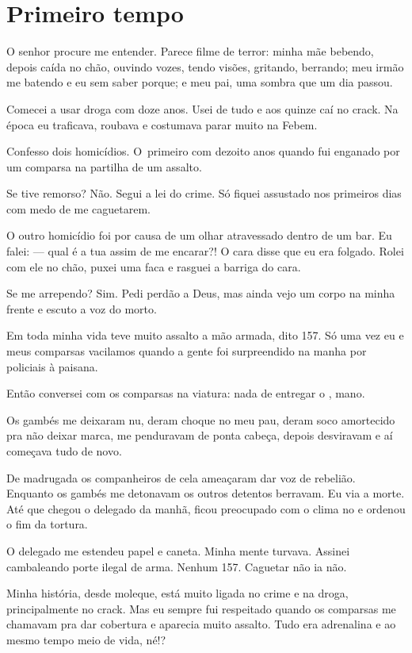  

\section{Primeiro tempo}

O senhor procure me entender. Parece filme de terror: minha mãe bebendo,
depois caída no chão, ouvindo vozes, tendo visões, gritando, berrando;
meu irmão me batendo e eu sem saber porque; e meu pai, uma sombra que um
dia passou.

\asterisc{}

Comecei a usar droga com doze anos. Usei de tudo e aos quinze caí no
crack. Na época eu traficava, roubava e costumava parar muito na Febem.

Confesso dois homicídios. O~primeiro com dezoito anos quando fui
enganado por um comparsa na partilha de um assalto.

Se tive remorso? Não. Segui a lei do crime. Só fiquei assustado nos
primeiros dias com medo de me caguetarem.

O outro homicídio foi por causa de um olhar atravessado dentro de um
bar. Eu falei: --- qual é a tua assim de me encarar?! O cara disse que
eu era folgado. Rolei com ele no chão, puxei uma faca e rasguei a
barriga do cara.

Se me arrependo? Sim. Pedi perdão a Deus, mas ainda vejo um corpo na
minha frente e escuto a voz do morto.

Em toda minha vida teve muito assalto a mão armada, dito 157. Só uma vez
eu e meus comparsas vacilamos quando a gente foi surpreendido na manha
por policiais à paisana.

Então conversei com os comparsas na viatura: nada de entregar o ,
mano.

Os gambés me deixaram nu, deram choque no meu pau, deram soco amortecido
pra não deixar marca, me penduravam de ponta cabeça, depois desviravam e
aí começava tudo de novo.

De madrugada os companheiros de cela ameaçaram dar voz de rebelião.
Enquanto os gambés me detonavam os outros detentos berravam. Eu via a
morte. Até que chegou o delegado da manhã, ficou preocupado com o clima
no  e ordenou o fim da tortura.

O delegado me estendeu papel e caneta. Minha mente turvava. Assinei
cambaleando porte ilegal de arma. Nenhum 157. Caguetar não ia não.

Minha história, desde moleque, está muito ligada no crime e na droga,
principalmente no crack. Mas eu sempre fui respeitado quando os
comparsas me chamavam pra dar cobertura e aparecia muito assalto. Tudo
era adrenalina e ao mesmo tempo meio de vida, né!?

